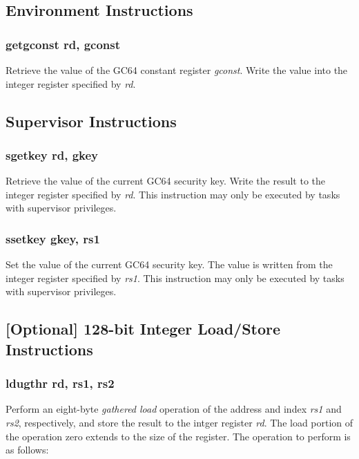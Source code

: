 \documentclass{article}
\begin{document}
\subsection{Environment Instructions}
\subsubsection{getgconst rd, gconst}

Retrieve the value of the GC64 constant register \emph{gconst}.  Write
the value into the integer register specified by \emph{rd}.

\subsection{Supervisor Instructions}
\subsubsection{sgetkey rd, gkey}

Retrieve the value of the current GC64 security key.  Write
the result to the integer register specified by \emph{rd}.  This
instruction may only be executed by tasks with supervisor privileges. 

\subsubsection{ssetkey gkey, rs1}

Set the value of the current GC64 security key.  The value is written
from the integer register specified by \emph{rs1}.  This instruction
may only be executed by tasks with supervisor privileges.  

\subsection{[Optional] 128-bit Integer Load/Store Instructions}

\subsubsection{ldugthr rd, rs1, rs2}

Perform an eight-byte \emph{gathered load} operation of the address and
index \emph{rs1} and \emph{rs2}, respectively, and store the result
to the intger register \emph{rd}.  The load portion of the operation
zero extends to the size of the register.
The operation to perform is as follows:
\end{document}
